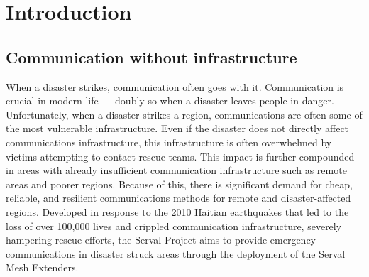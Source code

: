 
\chapter{Introduction}\label{chapter:firstchapter} %

\label{Chapter1} %

\section{Communication without infrastructure}
When a disaster strikes, communication often goes with it.
Communication is crucial in modern life — doubly so when a disaster leaves people in danger.
Unfortunately, when a disaster strikes a region, communications are often some of the most vulnerable infrastructure.
Even if the disaster does not directly affect communications infrastructure, this infrastructure is often overwhelmed by victims attempting to contact rescue teams.
This impact is  further compounded in areas with already insufficient communication infrastructure such as remote areas and poorer regions.
Because of this, there is significant demand for cheap, reliable, and resilient communications methods for remote and disaster-affected regions.
Developed in response to the 2010 Haitian earthquakes that led to the loss of over 100,000 lives and crippled communication infrastructure, severely hampering rescue efforts, the Serval Project aims to provide emergency communications in disaster struck areas through the deployment of the Serval Mesh Extenders.


